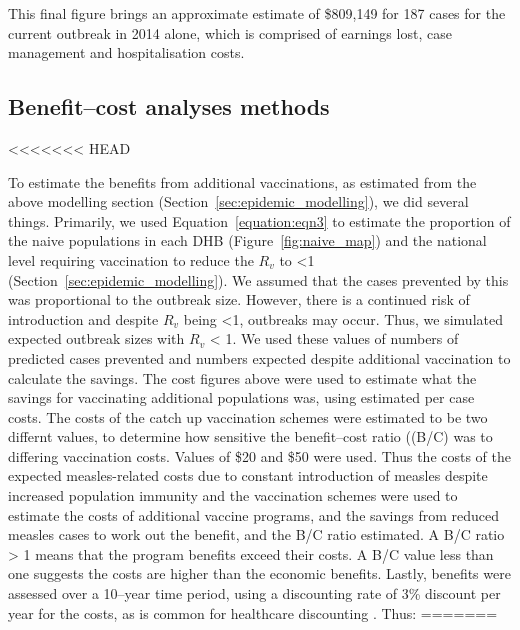 \documentclass{article}
\begin{document}
\begin{itemize}
This final figure brings an approximate estimate of \$809,149 for 187 cases for the current outbreak in 2014 alone, which is comprised of earnings lost, case management and hospitalisation costs.

\subsection{Benefit--cost analyses methods}
<<<<<<< HEAD
\label{sub:cost_benefit}

To estimate the benefits from additional vaccinations, as estimated from the above modelling section (Section~\ref{sec:epidemic_modelling}), we did several things. Primarily, we used Equation~\ref{equation:eqn3} to estimate the proportion of the naive populations in each DHB (Figure~\ref{fig:naive_map}) and the national level requiring vaccination to reduce the $R_v$ to <1 (Section~\ref{sec:epidemic_modelling}). We assumed that the cases prevented by this was proportional to the outbreak size. However, there is a continued risk of introduction and despite $R_v$ being <1, outbreaks may occur. Thus, we simulated expected outbreak sizes with $R_v$ < 1. We used these values of numbers of predicted cases prevented and numbers expected despite additional vaccination to calculate the savings. The cost figures above were used to estimate what the savings for vaccinating additional populations was, using estimated per case costs. The costs of the catch up vaccination schemes were estimated to be two differnt values, to determine how sensitive the benefit--cost ratio ((B/C) was to differing vaccination costs. Values of \$20 and \$50 were used. Thus the costs of the expected measles-related costs due to constant introduction of measles despite increased population immunity and the vaccination schemes were used to estimate the costs of additional vaccine programs, and the savings from reduced measles cases to work out the benefit, and the B/C ratio estimated. A B/C ratio > 1 means that the program benefits exceed their costs. A B/C value less than one suggests the costs are higher than the economic benefits. Lastly, benefits were assessed over a 10--year time period, using a discounting rate of 3\% discount per year for the costs, as is common for healthcare discounting \citep{honeycutt6}. Thus:
=======

\end{itemize}
\end{document}
